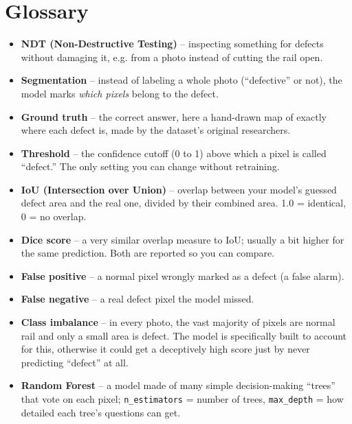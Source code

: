 \documentclass[11pt]{article}
\begin{document}
\section*{Glossary}
\begin{itemize}
  \item \textbf{NDT (Non-Destructive Testing)} -- inspecting something for defects without damaging it, e.g. from a photo instead of cutting the rail open.
  \item \textbf{Segmentation} -- instead of labeling a whole photo (``defective'' or not), the model marks \emph{which pixels} belong to the defect.
  \item \textbf{Ground truth} -- the correct answer, here a hand-drawn map of exactly where each defect is, made by the dataset's original researchers.
  \item \textbf{Threshold} -- the confidence cutoff (0 to 1) above which a pixel is called ``defect.'' The only setting you can change without retraining.
  \item \textbf{IoU (Intersection over Union)} -- overlap between your model's guessed defect area and the real one, divided by their combined area. 1.0 = identical, 0 = no overlap.
  \item \textbf{Dice score} -- a very similar overlap measure to IoU; usually a bit higher for the same prediction. Both are reported so you can compare.
  \item \textbf{False positive} -- a normal pixel wrongly marked as a defect (a false alarm).
  \item \textbf{False negative} -- a real defect pixel the model missed.
  \item \textbf{Class imbalance} -- in every photo, the vast majority of pixels are normal rail and only a small area is defect. The model is specifically built to account for this, otherwise it could get a deceptively high score just by never predicting ``defect'' at all.
  \item \textbf{Random Forest} -- a model made of many simple decision-making ``trees'' that vote on each pixel; \texttt{n\_estimators} = number of trees, \texttt{max\_depth} = how detailed each tree's questions can get.
\end{itemize}
\end{document}
